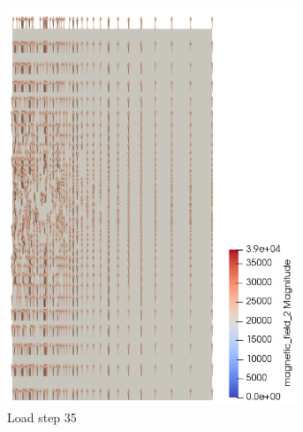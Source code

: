 \documentclass[11pt,a4paper,final]{article}
\begin{document}
\begin{figure}[h]
\begin{subfigure}{0.32\textwidth}
\includegraphics[width=0.95\textwidth]{magnetic_field_35.png}
\caption{Load step 35}
\label{fig:3.7.2}
\end{subfigure}
\begin{subfigure}{0.32\textwidth}
\centering

\end{subfigure}
\end{figure}
\end{document}
